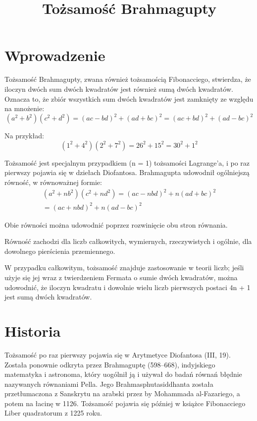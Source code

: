 \documentclass{article}
\begin{document}
\title{Tożsamość Brahmagupty}
\maketitle

\section*{Wprowadzenie}
Tożsamość Brahmagupty, zwana również tożsamością Fibonacciego, stwierdza, że iloczyn dwóch sum dwóch kwadratów jest również sumą dwóch kwadratów. Oznacza to, że zbiór wszystkich sum dwóch kwadratów jest zamknięty ze względu na mnożenie: 
\begin{displaymath}
\left(a^{2}+b^{2}\right)\left(c^{2}+d^{2}\right)=\left(ac-bd\right)^{2}+\left(ad+bc\right)^{2} =\left(ac+bd\right)^{2}+\left(ad-bc\right)^{2}
\end{displaymath}

Na przykład:
\[ (1^{2}+4^{2})(2^{2}+7^{2})=26^{2}+15^{2}=30^{2}+1^{2} \]

Tożsamość jest specjalnym przypadkiem (n = 1) tożsamości Lagrange’a, i po raz pierwszy pojawia się w dziełach Diofantosa. Brahmagupta udowodnił ogólniejszą równość, w równoważnej formie: 
\begin{multline*}
 \left(a^{2}+nb^{2}\right)\left(c^{2}+nd^{2}\right)=\left(ac-nbd\right)^{2}+n\left(ad+bc\right)^{2}\\
 =\left(ac+nbd\right)^{2}+n\left(ad-bc\right)^{2}
\end{multline*} 

Obie równości można udowodnić poprzez rozwinięcie obu stron równania. 

Równość zachodzi dla liczb całkowitych, wymiernych, rzeczywistych i ogólnie, dla dowolnego pierścienia przemiennego. 

W przypadku całkowitym, tożsamość znajduje zastosowanie w teorii liczb; jeśli użyje się jej wraz z twierdzeniem Fermata o sumie dwóch kwadratów, można udowodnić, że iloczyn kwadratu i dowolnie wielu liczb pierwszych postaci 4n + 1 jest sumą dwóch kwadratów. 

\section*{Historia}
Tożsamość po raz pierwszy pojawia się w Arytmetyce Diofantosa (III, 19). Została ponownie odkryta przez Brahmaguptę (598–668), indyjskiego matematyka i astronoma, który uogólnił ją i używał do badań równań błędnie nazywanych równaniami Pella. Jego Brahmasphutasiddhanta została przetłumaczona z Sanskrytu na arabski przez by Mohammada al-Fazariego, a potem na łacinę w 1126. Tożsamość pojawia się później w książce Fibonacciego Liber quadratorum z 1225 roku. 
\end{document}
